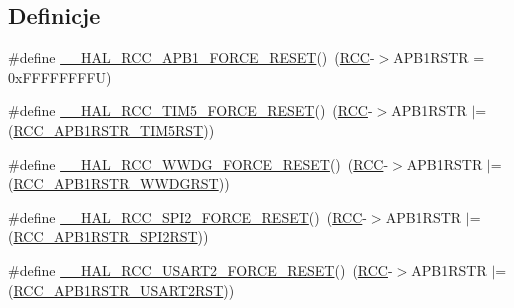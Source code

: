 \subsection*{Definicje}
\begin{DoxyCompactItemize}
\item 
\#define \hyperlink{group___r_c_c___a_p_b1___force___release___reset_ga6f6e7048eca1abd1be132027f5b79465}{\+\_\+\+\_\+\+H\+A\+L\+\_\+\+R\+C\+C\+\_\+\+A\+P\+B1\+\_\+\+F\+O\+R\+C\+E\+\_\+\+R\+E\+S\+ET}()~(\hyperlink{group___peripheral__declaration_ga74944438a086975793d26ae48d5882d4}{R\+CC}-\/$>$A\+P\+B1\+R\+S\+TR = 0x\+F\+F\+F\+F\+F\+F\+F\+F\+U)
\item 
\#define \hyperlink{group___r_c_c___a_p_b1___force___release___reset_ga20ca12317dd14485d79902863aad063b}{\+\_\+\+\_\+\+H\+A\+L\+\_\+\+R\+C\+C\+\_\+\+T\+I\+M5\+\_\+\+F\+O\+R\+C\+E\+\_\+\+R\+E\+S\+ET}()~(\hyperlink{group___peripheral__declaration_ga74944438a086975793d26ae48d5882d4}{R\+CC}-\/$>$A\+P\+B1\+R\+S\+TR $\vert$= (\hyperlink{group___peripheral___registers___bits___definition_ga1d1233dd5266ba55d9951e3b1a334552}{R\+C\+C\+\_\+\+A\+P\+B1\+R\+S\+T\+R\+\_\+\+T\+I\+M5\+R\+ST}))
\item 
\#define \hyperlink{group___r_c_c___a_p_b1___force___release___reset_gaf60e74dcb0fdadafd6b4762aa81fc409}{\+\_\+\+\_\+\+H\+A\+L\+\_\+\+R\+C\+C\+\_\+\+W\+W\+D\+G\+\_\+\+F\+O\+R\+C\+E\+\_\+\+R\+E\+S\+ET}()~(\hyperlink{group___peripheral__declaration_ga74944438a086975793d26ae48d5882d4}{R\+CC}-\/$>$A\+P\+B1\+R\+S\+TR $\vert$= (\hyperlink{group___peripheral___registers___bits___definition_ga0d2591ac0655a8798f4c16cef97e6f94}{R\+C\+C\+\_\+\+A\+P\+B1\+R\+S\+T\+R\+\_\+\+W\+W\+D\+G\+R\+ST}))
\item 
\#define \hyperlink{group___r_c_c___a_p_b1___force___release___reset_ga869e4f5c1132e3dfce084099cf454c51}{\+\_\+\+\_\+\+H\+A\+L\+\_\+\+R\+C\+C\+\_\+\+S\+P\+I2\+\_\+\+F\+O\+R\+C\+E\+\_\+\+R\+E\+S\+ET}()~(\hyperlink{group___peripheral__declaration_ga74944438a086975793d26ae48d5882d4}{R\+CC}-\/$>$A\+P\+B1\+R\+S\+TR $\vert$= (\hyperlink{group___peripheral___registers___bits___definition_ga0a6289a35547cf0d5300706f9baa18ea}{R\+C\+C\+\_\+\+A\+P\+B1\+R\+S\+T\+R\+\_\+\+S\+P\+I2\+R\+ST}))
\item 
\#define \hyperlink{group___r_c_c___a_p_b1___force___release___reset_gab4de80173ffa0e599baab0e76d562cc3}{\+\_\+\+\_\+\+H\+A\+L\+\_\+\+R\+C\+C\+\_\+\+U\+S\+A\+R\+T2\+\_\+\+F\+O\+R\+C\+E\+\_\+\+R\+E\+S\+ET}()~(\hyperlink{group___peripheral__declaration_ga74944438a086975793d26ae48d5882d4}{R\+CC}-\/$>$A\+P\+B1\+R\+S\+TR $\vert$= (\hyperlink{group___peripheral___registers___bits___definition_ga195c39f08384ca1fa13b53a31d65d0a5}{R\+C\+C\+\_\+\+A\+P\+B1\+R\+S\+T\+R\+\_\+\+U\+S\+A\+R\+T2\+R\+ST}))

\end{DoxyCompactItemize}

